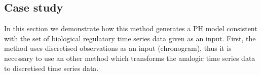 
\subsection{Case study}
\label{sec:case_study}

In this section we demonstrate how this method generates a PH model consistent with the set of biological regulatory time series data given as an input. 
First, the method uses discretised observations as an input (\ie chronogram), thus it is necessary to use an other method which transforms the analogic time series data to discretised time series data.



